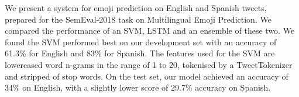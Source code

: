 We present a system for emoji prediction on English and Spanish tweets, prepared for the SemEval-2018 task on Multilingual Emoji Prediction. We compared the performance of an SVM, LSTM and an ensemble of these two. We found the SVM performed best on our development set with an accuracy of 61.3\% for English and 83\% for Spanish. The features used for the SVM are lowercased word n-grams in the range of 1 to 20, tokenised by a TweetTokenizer and stripped of stop words. On the test set, our model achieved an accuracy of 34\% on English, with a slightly lower score of 29.7\% accuracy on Spanish.

